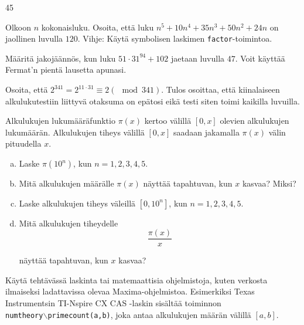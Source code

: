 \begin{kotitehtavasivu}
\begin{tehtava}
    \begin{vastaus}
        45
    \end{vastaus}
    
\end{tehtava}

\begin{tehtava}
    Olkoon $n$ kokonaisluku. Osoita, että luku $n^5+10n^4+35n^3+50n^2+24n$ on jaollinen luvulla $120$. Vihje: Käytä symbolisen laskimen {\tt factor}-toimintoa.
\end{tehtava}


\begin{tehtava}
    Määritä jakojäännös, kun luku $51\cdot 31^{94}+102$ jaetaan
    luvulla $47$. Voit käyttää Fermat'n pientä lausetta apunasi.
\end{tehtava}

\begin{tehtava}
    Osoita, että $2^{341} = 2^{11 \cdot 31} \equiv 2 (\mod 341)
    $. Tulos osoittaa, että kiinalaiseen alkulukutestiin liittyvä
    otaksuma on epätosi eikä testi siten toimi kaikilla luvuilla.
\end{tehtava}

\begin{tehtava}
    Alkulukujen lukumääräfunktio $\pi(x)$ kertoo välillä $[0, x]$
    olevien alkulukujen lukumäärän. Alkulukujen tiheys välillä $[0, x]
    $ saadaan jakamalla $\pi(x)$ välin pituudella $x$.
    \begin{enumerate}[a)]
    \item Laske $\pi(10^n)$, kun $n=1, 2, 3, 4, 5$.
    \item Mitä alkulukujen määrälle $\pi(x)$ näyttää tapahtuvan,
    kun $x$ kasvaa? Miksi?
    \item Laske alkulukujen tiheys väleillä $[0, 10^n]$, kun
    $n=1, 2, 3, 4, 5$.
    \item Mitä alkulukujen tiheydelle
    \[
    \frac{\pi(x)}{x}
    \]

    näyttää tapahtuvan, kun $x$ kasvaa?
    \end{enumerate}
    Käytä tehtävässä laskinta tai matemaattisia ohjelmistoja, kuten
    verkosta ilmaiseksi ladattavissa olevaa Maxima-ohjelmistoa.
    Esimerkiksi Texas Instrumentsin TI-Nspire CX CAS -laskin sisältää
    toiminnon \\{\tt numtheory$\backslash$primecount(a,b)}, joka antaa
    alkulukujen määrän välillä $[a, b]$.
\end{tehtava}


\end{kotitehtavasivu}
